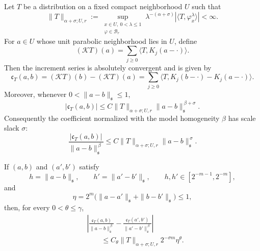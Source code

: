 \begin{proposition}
Let \(T\) be a distribution on a fixed compact neighborhood \(U\) such that
\begin{equation}
  \|T\|_{\alpha+\sigma;U,r}
  :=
  \sup_{\substack{x\in U,\ 0<\lambda\leq1\\ \varphi\in\mathcal B_r}}
  \lambda^{-(\alpha+\sigma)}
  |\langle T,\varphi_x^\lambda\rangle|
  <\infty .
  \label{eq:spde-reexpansion-negative-distribution-norm}
\end{equation}
For \(a\in U\) whose unit parabolic neighborhood lies in \(U\), define
\begin{equation}
  (\mathcal KT)(a)
  =
  \sum_{j\geq0}\langle T,K_j(a-\cdot)\rangle .
  \label{eq:spde-reexpansion-integrated-distribution}
\end{equation}
Then the increment series is absolutely convergent and is given by
\begin{equation}
  \mathfrak c_T(a,b)
  =
  (\mathcal KT)(b)-(\mathcal KT)(a)
  =
  \sum_{j\geq0}
  \langle T,K_j(b-\cdot)-K_j(a-\cdot)\rangle .
  \label{eq:spde-reexpansion-coefficient-definition}
\end{equation}
Moreover, whenever \(0<\|a-b\|_{\mathfrak s}\leq1\),
\begin{equation}
  |\mathfrak c_T(a,b)|
  \leq
  C\|T\|_{\alpha+\sigma;U,r}
  \|a-b\|_{\mathfrak s}^{\,\beta+\sigma}.
  \label{eq:spde-reexpansion-coefficient-holder}
\end{equation}
Consequently the coefficient normalized with the model homogeneity \(\beta\)
has scale slack \(\sigma\):
\begin{equation}
  \frac{|\mathfrak c_T(a,b)|}
       {\|a-b\|_{\mathfrak s}^{\,\beta}}
  \leq
  C\|T\|_{\alpha+\sigma;U,r}
  \|a-b\|_{\mathfrak s}^{\,\sigma}.
  \label{eq:spde-reexpansion-normalized-scale-slack}
\end{equation}

If \((a,b)\) and \((a',b')\) satisfy
\[
  h=\|a-b\|_{\mathfrak s},\qquad
  h'=\|a'-b'\|_{\mathfrak s},\qquad
  h,h'\in[2^{-m-1},2^{-m}],
\]
and
\[
  \eta=
  2^m\bigl(\|a-a'\|_{\mathfrak s}+\|b-b'\|_{\mathfrak s}\bigr)
  \leq1,
\]
then, for every \(0<\theta\leq\gamma\),
\begin{equation}
\begin{aligned}
  &\left|
    \frac{\mathfrak c_T(a,b)}{\|a-b\|_{\mathfrak s}^{\,\beta}}
    -
    \frac{\mathfrak c_T(a',b')}{\|a'-b'\|_{\mathfrak s}^{\,\beta}}
  \right|                                                   \\
  &\qquad\leq
  C_\theta
  \|T\|_{\alpha+\sigma;U,r}
  2^{-\sigma m}\eta^\theta .
\end{aligned}
  \label{eq:spde-reexpansion-normalized-edge-bound}
\end{equation}
\end{proposition}

